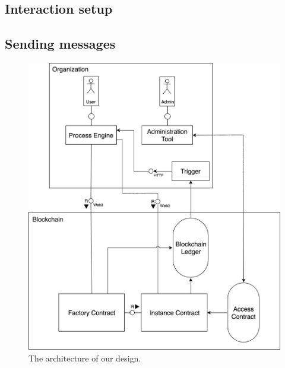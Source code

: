 \documentclass[runningheads]{llncs}
\begin{document}
\subsection{Interaction setup}

\subsection{Sending messages}

\begin{figure}
\includegraphics[width=\textwidth]{fig/system_diagram.eps}
\caption{The architecture of our design.} \label{fig1}
\end{figure}
\end{document}
